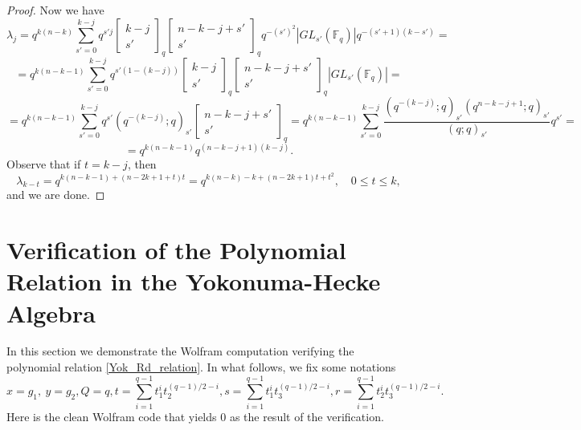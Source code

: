 \documentclass[12pt,reqno]{amsart}
\theoremstyle{definition}
\theoremstyle{remark}
\numberwithin{equation}{section}
\newcommand{\GL}[1]{GL_{#1}(\mathbb{F}_q)}
\begin{document}
\begin{proof}
    Now we have
    \[
     \lambda_j = q^{k(n-k)}\sum_{s'=0}^{k-j}q^{s'j}\begin{bmatrix}
    k-j\\
    s'
\end{bmatrix}_q \begin{bmatrix}
    n-k-j+s'\\
    s'
\end{bmatrix}_q
q^{-(s')^2}|\GL{s'}|q^{-(s'+1)(k-s')}=
    \]
    \[
    =q^{k(n-k-1)}\sum_{s'=0}^{k-j}q^{s'(1-(k-j))}\begin{bmatrix}
    k-j\\
    s'
\end{bmatrix}_q \begin{bmatrix}
    n-k-j+s'\\
    s'
\end{bmatrix}_q
|\GL{s'}|=
    \]
    \[
    =q^{k(n-k-1)}\sum_{s'=0}^{k-j}q^{s'}(q^{-(k-j)};q)_{s'} \begin{bmatrix}
    n-k-j+s'\\
    s'
\end{bmatrix}_q=q^{k(n-k-1)}\sum_{s'=0}^{k-j}\frac{(q^{-(k-j)};q)_{s'}(q^{n-k-j+1};q)_{s'}}{(q;q)_{s'}}q^{s'}=
    \]
    \[
    =q^{k(n-k-1)}q^{(n-k-j+1)(k-j)}.
    \]
    Observe that if $t=k-j$, then
    \[
    \lambda_{k-t}=q^{k(n-k-1)+(n-2k+1+t)t}=q^{k(n-k)-k+(n-2k+1)t+t^2}, \quad 0\le t \le k,
    \]
    and we are done.
\end{proof}



\appendix

\section{Verification of the Polynomial Relation in the Yokonuma-Hecke Algebra}
In this section we demonstrate the Wolfram computation verifying the polynomial relation \eqref{Yok_Rd_relation}. In what follows, we fix some notations
\begin{equation}
    x=g_1,\ y=g_2, Q=q, t=\sum_{i=1}^{q-1}t_1^i t_2^{(q-1)/2-i}, s=\sum_{i=1}^{q-1}t_1^i t_3^{(q-1)/2-i},r=\sum_{i=1}^{q-1}t_2^i t_3^{(q-1)/2-i}.
\end{equation}
Here is the clean Wolfram code that yields $0$ as the result of the verification.

\end{document}
